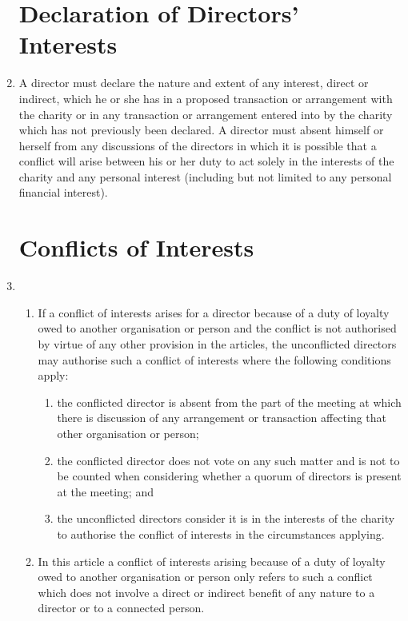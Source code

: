 \begin{enumerate}
\section{Declaration of Directors' Interests}

\item \label{directors-interests}
  A director must declare the nature and extent of any interest,
  direct or indirect, which he or she has in a proposed transaction
  or arrangement with the charity or in any transaction or
  arrangement entered into by the charity which has not previously
  been declared. A director must absent himself or herself from any
  discussions of the directors in which it is possible that a
  conflict will arise between his or her duty to act solely in the
  interests of the charity and any personal interest (including but
  not limited to any personal financial interest).

\section{Conflicts of Interests}

\item 
  \begin{enumerate}
  \item
    If a conflict of interests arises for a director because of a duty
    of loyalty owed to another organisation or person and the conflict
    is not authorised by virtue of any other provision in the articles,
    the unconflicted directors may authorise such a conflict of
    interests where the following conditions apply:
    \begin{enumerate}
    \item
      the conflicted director is absent from the part of the meeting at
      which there is discussion of any arrangement or transaction
      affecting that other organisation or person;
    \item
      the conflicted director does not vote on any such matter and is not
      to be counted when considering whether a quorum of directors is
      present at the meeting; and
    \item
      the unconflicted directors consider it is in the interests of the
      charity to authorise the conflict of interests in the circumstances
      applying.
    \end{enumerate}
  \item \label{conflict-interest-loyalty}
    In this article a conflict of interests arising because of a duty
    of loyalty owed to another organisation or person only refers to
    such a conflict which does not involve a direct or indirect benefit
    of any nature to a director or to a connected person.
  \end{enumerate}


\end{enumerate}
